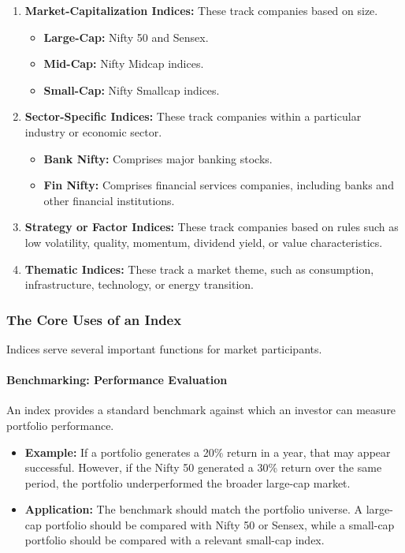 \documentclass[12pt,openany]{book}
\begin{document}
\begin{enumerate}[leftmargin=*]
    \item \textbf{Market-Capitalization Indices:} These track companies based on size.
    \begin{itemize}[leftmargin=*]
        \item \textbf{Large-Cap:} Nifty 50 and Sensex.
        \item \textbf{Mid-Cap:} Nifty Midcap indices.
        \item \textbf{Small-Cap:} Nifty Smallcap indices.
    \end{itemize}

    \item \textbf{Sector-Specific Indices:} These track companies within a particular industry or economic sector.
    \begin{itemize}[leftmargin=*]
        \item \textbf{Bank Nifty:} Comprises major banking stocks.
        \item \textbf{Fin Nifty:} Comprises financial services companies, including banks and other financial institutions.
    \end{itemize}

    \item \textbf{Strategy or Factor Indices:} These track companies based on rules such as low volatility, quality, momentum, dividend yield, or value characteristics.

    \item \textbf{Thematic Indices:} These track a market theme, such as consumption, infrastructure, technology, or energy transition.
\end{enumerate}

\subsubsection{The Core Uses of an Index}
Indices serve several important functions for market participants.

\paragraph{Benchmarking: Performance Evaluation}
An index provides a standard benchmark against which an investor can measure portfolio performance.

\begin{itemize}[leftmargin=*]
    \item \textbf{Example:} If a portfolio generates a 20\% return in a year, that may appear successful. However, if the Nifty 50 generated a 30\% return over the same period, the portfolio underperformed the broader large-cap market.
    \item \textbf{Application:} The benchmark should match the portfolio universe. A large-cap portfolio should be compared with Nifty 50 or Sensex, while a small-cap portfolio should be compared with a relevant small-cap index.
\end{itemize}
\end{document}
